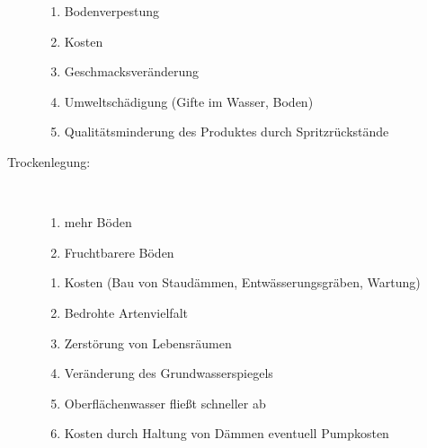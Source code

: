 \begin{description}
	\begin{enumerate}[{Kontra }1:]
		\item Bodenverpestung
		\item Kosten
		\item Geschmacksveränderung
		\item Umweltschädigung (Gifte im Wasser, Boden)
		\item Qualitätsminderung des Produktes durch Spritzrückstände
	\end{enumerate}
	\item[Trockenlegung:]~
	\begin{enumerate}[{Pro }1:]
		\item mehr Böden
		\item Fruchtbarere Böden
	\end{enumerate}
	\begin{enumerate}[{Kontra }1:]
		\item Kosten (Bau von Staudämmen, Entwässerungsgräben, Wartung)
		\item Bedrohte Artenvielfalt
		\item Zerstörung von Lebensräumen
		\item Veränderung des Grundwasserspiegels
		\item Oberflächenwasser fließt schneller ab
		\item Kosten durch Haltung von Dämmen eventuell Pumpkosten
	\end{enumerate}


\end{description}
